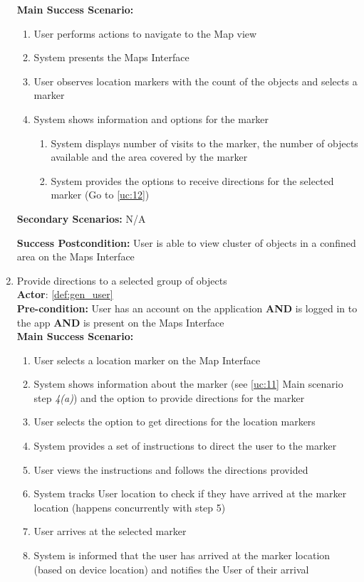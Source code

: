 \documentclass{article}
\begin{document}
\begin{enumerate}[label=\textbf{UC\arabic*}]
        \textbf{Main Success Scenario:}
        \begin{enumerate}[label=\textbf{\arabic*.}]
            \item User performs actions to navigate to the Map view
            \item System presents the Maps Interface
            \item User observes location markers with the count of the objects and selects a marker
            \item System shows information and options for the marker
            \begin{enumerate}[label=(\alph*)]
                \item System displays number of visits to the marker, the number of objects available and the area covered by the marker
                \item System provides the options to receive directions for the selected marker (Go to \ref{uc:12})
            \end{enumerate}
        \end{enumerate}

        \textbf{Secondary Scenarios:}
        N/A

        \textbf{Success Postcondition:} User is able to view cluster of objects in a confined area on the Maps Interface

    \item \label{uc:12}  Provide directions to a selected group of objects \\
        \textbf{Actor}: \ref{def:gen_user} \\
        \textbf{Pre-condition:} User has an account on the application \textbf{AND} is logged in to the app \textbf{AND} is present on the Maps Interface \\

        \textbf{Main Success Scenario:}
        \begin{enumerate}[label=\textbf{\arabic*.}]
            \item User selects a location marker on the Map Interface
            \item System shows information about the marker (see \ref{uc:11} Main scenario step \textit{4(a)}) and the option to provide directions for the marker
            \item User selects the option to get directions for the location markers
            \item System provides a set of instructions to direct the user to the marker
            \item User views the instructions and follows the directions provided
            \item System tracks User location to check if they have arrived at the marker location (happens concurrently with step 5)
            \item User arrives at the selected marker
            \item System is informed that the user has arrived at the marker location (based on device location) and notifies the User of their arrival
        \end{enumerate}


\end{enumerate}
\end{document}
